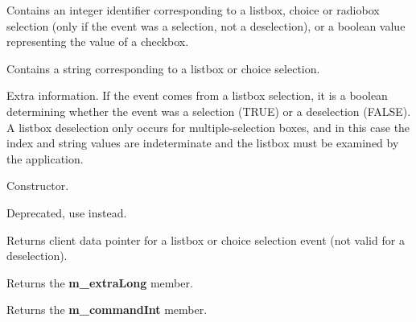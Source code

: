 

Contains an integer identifier corresponding to a listbox, choice or
radiobox selection (only if the event was a selection, not a
deselection), or a boolean value representing the value of a checkbox.



Contains a string corresponding to a listbox or choice selection.



Extra information. If the event comes from a listbox selection, it is
a boolean determining whether the event was a selection (TRUE) or a
deselection (FALSE). A listbox deselection only occurs for
multiple-selection boxes, and in this case the index and string values
are indeterminate and the listbox must be examined by the application.



Constructor.



Deprecated, use  instead.



Returns client data pointer for a listbox or choice selection event
(not valid for a deselection).



Returns the {\bf m\_extraLong} member.



Returns the {\bf m\_commandInt} member.



